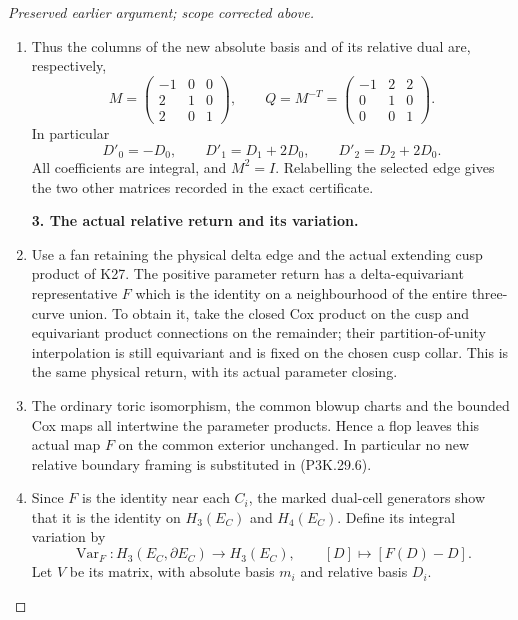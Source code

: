 \begin{proof}[Preserved earlier argument; scope corrected above]
\begin{enumerate}[label=\arabic*.]
\item Thus the columns of the new absolute basis and of its relative
dual are, respectively,
\[
 M=
 \begin{pmatrix}-1&0&0\\2&1&0\\2&0&1\end{pmatrix},
 \qquad
 Q=M^{-T}=
 \begin{pmatrix}-1&2&2\\0&1&0\\0&0&1\end{pmatrix}.
                                                        \tag{P3K.29.6}
\]
In particular
\[
              D'_0=-D_0,\qquad
              D'_1=D_1+2D_0,\qquad
              D'_2=D_2+2D_0.                           \tag{P3K.29.7}
\]
All coefficients are integral, and \(M^2=I\). Relabelling
the selected edge gives the two other matrices recorded in
the exact certificate.

\par\medskip\noindent\textbf{3. The actual relative return and its variation.}\enspace

\item Use a fan retaining the physical delta edge and the actual
extending cusp product of K27. The positive parameter return
has a delta-equivariant representative \(F\) which is the
identity on a neighbourhood of the entire three-curve union.
To obtain it, take the closed Cox product on the cusp and
equivariant product connections on the remainder; their
partition-of-unity interpolation is still equivariant and is
fixed on the chosen cusp collar. This is the same physical
return, with its actual parameter closing.

\item The ordinary toric isomorphism, the common blowup charts and
the bounded Cox maps all intertwine the parameter products.
Hence a flop leaves this actual map \(F\) on the common
exterior unchanged. In particular no new relative boundary
framing is substituted in (P3K.29.6).

\item Since \(F\) is the identity near each \(C_i\), the marked
dual-cell generators show that it is the identity on
\(H_3(E_C)\) and \(H_4(E_C)\). Define its integral variation by
\[
 \operatorname{Var}_F:H_3(E_C,\partial E_C)\longrightarrow
 H_3(E_C),\qquad [D]\longmapsto[F(D)-D].
                                                        \tag{P3K.29.8}
\]
Let \(V\) be its matrix, with absolute basis \(m_i\) and
relative basis \(D_i\).


\end{enumerate}
\end{proof}
